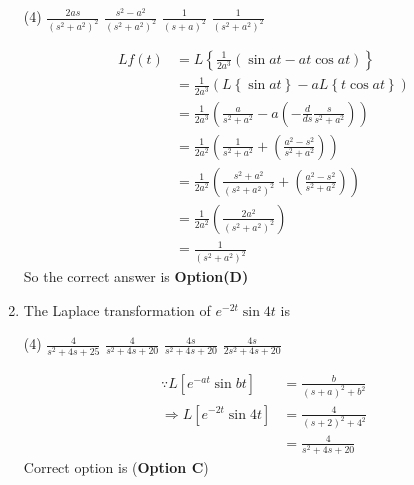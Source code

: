 \begin{enumerate}
	\begin{tasks}(4)
		\task[\textbf{A.}] $\frac{2 a s}{\left(s^{2}+a^{2}\right)^{2}}$
		\task[\textbf{B.}]$\frac{s^{2}-a^{2}}{\left(s^{2}+a^{2}\right)^{2}}$
		\task[\textbf{C.}]$\frac{1}{(s+a)^{2}}$
		\task[\textbf{D.}]$\frac{1}{\left(s^{2}+a^{2}\right)^{2}}$
	\end{tasks}
\begin{answer}
	\begin{align*}
		L{f(t)}&=L\left\{\frac{1}{2 a^{3}}(\sin a t-a t \cos a t)\right\} \\
		&=\frac{1}{2 a^{3}}(L\left\lbrace {\sin a t}\right\rbrace -a L\left\lbrace  {t \cos a t}\right\rbrace )\\
		&=\frac{1}{2 a^{3}}\left(\frac{a}{s^{2}+a^{2}}-a\left(-\frac{d}{d s} \frac{s}{s^{2}+a^{2}}\right)\right)\\
		&=\frac{1}{2 a^{2}}\left(\frac{1}{s^{2}+a^{2}}+\left( \frac{a^{2}-s^{2}}{s^{2}+a^{2}}\right)\right)\\
		&=\frac{1}{2 a^{2}}\left(\frac{s^{2}+a^{2}}{(s^{2}+a^{2})^{2}}+\left( \frac{a^{2}-s^{2}}{s^{2}+a^{2}}\right)\right)\\
		&=\frac{1}{2 a^{2}}\left(\frac{2a^{2}}{(s^{2}+a^{2})^{2}}\right) \\
		&=\frac{1}{(s^{2}+a^{2})^{2}}
		\end{align*}
		So the correct answer is \textbf{Option(D)}
\end{answer}
\item 	 The Laplace transformation of $e^{-2 t} \sin 4 t$ is
{}

\begin{tasks}(4)
\task[\textbf{A.}] $\frac{4}{s^{2}+4 s+25}$
\task[\textbf{B.}]$\frac{4}{s^{2}+4 s+20}$
\task[\textbf{C.}]$\frac{4 s}{s^{2}+4 s+20}$
\task[\textbf{D.}]$\frac{4 s}{2 s^{2}+4 s+20}$
\end{tasks}
\begin{answer}
\begin{align*}
\because L\left[e^{-a t} \sin b t\right]&=\frac{b}{(s+a)^{2}+b^{2}}\\
\Rightarrow L\left[e^{-2 t} \sin 4 t\right]&=\frac{4}{(s+2)^{2}+4^{2}}\\&=\frac{4}{s^{2}+4 s+20}
\end{align*}
Correct option is (\textbf{Option C})
\end{answer}
\end{enumerate}
\setlength\arrayrulewidth{1pt}
